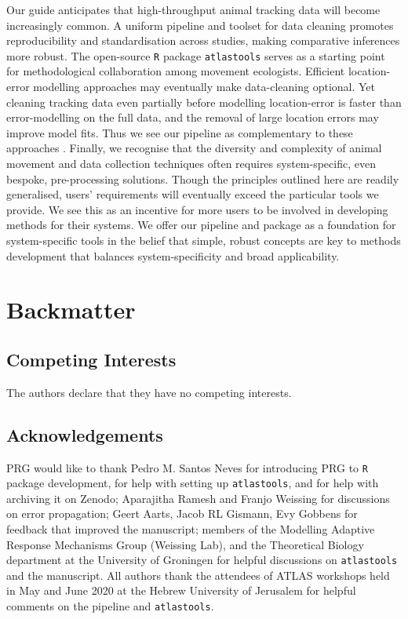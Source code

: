 \documentclass[10pt,paper=a4,headings=standardclasses
]{scrartcl}
\begin{document}
Our guide anticipates that high-throughput animal tracking data will become increasingly common.
A uniform pipeline and toolset for data cleaning promotes reproducibility and standardisation across studies, making comparative inferences more robust.
The open-source \texttt{R} package \texttt{atlastools} serves as a starting point for methodological collaboration among movement ecologists.
Efficient location-error modelling approaches \citep{fleming2020, aspillaga2021} may eventually make data-cleaning optional.
Yet cleaning tracking data even partially before modelling location-error is faster than error-modelling on the full data, and the removal of large location errors may improve model fits.
Thus we see our pipeline as complementary to these approaches \citep{fleming2014a, fleming2020}.
Finally, we recognise that the diversity and complexity of animal movement and data collection techniques often requires system-specific, even bespoke, pre-processing solutions.
Though the principles outlined here are readily generalised, users' requirements will eventually exceed the particular tools we provide.
We see this as an incentive for more users to be involved in developing methods for their systems.
We offer our pipeline and package as a foundation for system-specific tools in the belief that simple, robust concepts are key to methods development that balances system-specificity and broad applicability.

\section{Backmatter}

\subsection{Competing Interests}

The authors declare that they have no competing interests.

\subsection{Acknowledgements}

PRG would like to thank Pedro M. Santos Neves for introducing PRG to \texttt{R} package development, for help with setting up \texttt{atlastools}, and for help with archiving it on Zenodo; 
Aparajitha Ramesh and Franjo Weissing for discussions on error propagation;
Geert Aarts, Jacob RL Gismann, Evy Gobbens for feedback that improved the manuscript; 
members of the Modelling Adaptive Response Mechanisms Group (Weissing Lab), and the Theoretical Biology department at the University of Groningen for helpful discussions on \texttt{atlastools} and the manuscript.
All authors thank the attendees of ATLAS workshops held in May and June 2020 at the Hebrew University of Jerusalem for helpful comments on the pipeline and \texttt{atlastools}.
\end{document}
